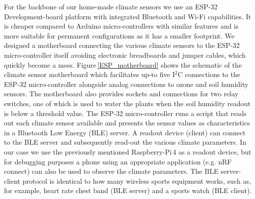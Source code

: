 \documentclass[reprint,superscriptaddress,aps,amsmath,amssymb]{revtex4-1}
\begin{document}
For the backbone of our home-made climate sensors we use an ESP-32 Development-board platform with integrated Bluetooth and Wi-Fi capabilities. It is cheaper compared to Arduino micro-controllers with similar features and is more suitable for permanent configurations as it has a smaller footprint. We designed a motherboard connecting the various climate sensors to the ESP-32 micro-controller itself avoiding electronic breadboards and jumper cables, which quickly become a mess. Figure\,\ref{ESP_motherboard} shows the schematic of the climate sensor motherboard which facilitates up-to five I$^2$C connections to the ESP-32 micro-controller alongside analog connections to ozone and soil humidity sensors. The motherboard also provides sockets and connections for two relay switches, one of which is used to water the plants when the soil humidity readout is below a threshold value. The ESP-32 micro-controller runs a script that reads out each climate sensor available and presents the sensor values as characteristics in a Bluetooth Low Energy (BLE) server. A readout device (client) can connect to the BLE server and subsequently read-out the various climate parameters. In our case we use the previously mentioned Raspberry-Pi\,4 as a readout device, but for debugging purposes a phone using an appropriate application (e.g. nRF connect) can also be used to observe the climate parameters. The BLE server-client protocol is identical to how many wireless sports equipment works, such as, for example, heart rate chest band (BLE server) and a sports watch (BLE client). 
\end{document}
